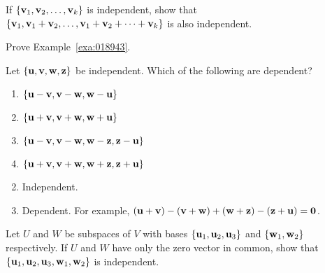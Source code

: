 \begin{multicols}{2}
\begin{ex}
If $\{\textbf{v}_{1}, \textbf{v}_{2}, \dots, \textbf{v}_{k}\}$ is independent, show that $\{\textbf{v}_{1}, \textbf{v}_{1} + \textbf{v}_{2}, \dots, \textbf{v}_{1} + \textbf{v}_{2} + \dots + \textbf{v}_{k}\}$ is also independent.
\end{ex}

\begin{ex}
\label{ex:6_3_22}
Prove Example~\ref{exa:018943}.
\end{ex}

\begin{ex}
Let $\{\textbf{u}, \textbf{v}, \textbf{w}, \textbf{z}\}$ be independent. Which of the following are dependent?

\begin{enumerate}[label={\alph*.}]
\item $\{\textbf{u} - \textbf{v}, \textbf{v} - \textbf{w}, \textbf{w} - \textbf{u}\}$

\item $\{\textbf{u} + \textbf{v}, \textbf{v} + \textbf{w}, \textbf{w} + \textbf{u}\}$

\item $\{\textbf{u} - \textbf{v}, \textbf{v} - \textbf{w}, \textbf{w} - \textbf{z}, \textbf{z} - \textbf{u}\}$

\item $\{\textbf{u} + \textbf{v}, \textbf{v} + \textbf{w}, \textbf{w} + \textbf{z}, \textbf{z} + \textbf{u}\}$

\end{enumerate}
\begin{sol}
\begin{enumerate}[label={\alph*.}]
\setcounter{enumi}{1}
\item  Independent.

\setcounter{enumi}{3}
\item  Dependent. For example, $(\textbf{u} + \textbf{v}) - (\textbf{v} + \textbf{w}) + (\textbf{w} + \textbf{z}) - (\textbf{z} + \textbf{u}) = \textbf{0}$.

\end{enumerate}
\end{sol}
\end{ex}

\begin{ex}
Let $U$ and $W$ be subspaces of $V$ with bases $\{\textbf{u}_{1}, \textbf{u}_{2}, \textbf{u}_{3}\}$ and $\{\textbf{w}_{1}, \textbf{w}_{2}\}$ respectively. If $U$ and $W$ have only the zero vector in common, show that $\{\textbf{u}_{1}, \textbf{u}_{2}, \textbf{u}_{3}, \textbf{w}_{1}, \textbf{w}_{2}\}$ is independent.
\end{ex}


\end{multicols}
